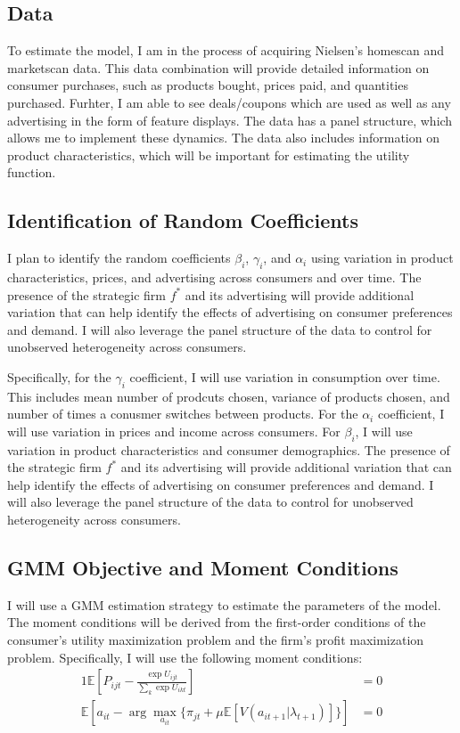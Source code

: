 \documentclass[12pt]{article}
\begin{document}
    \subsection{Data}
    To estimate the model, I am in the process of acquiring Nielsen's homescan and marketscan data. This data combination will provide detailed information on consumer purchases, such as products bought, prices paid, and quantities purchased. Furhter, I am able to see deals/coupons which are used as well as any advertising in the form of feature displays. The data has a panel structure, which allows me to implement these dynamics. The data also includes information on product characteristics, which will be important for estimating the utility function. 

    \subsection{Identification of Random Coefficients}

    I plan to identify the random coefficients $\beta_i$, $\gamma_i$, and $\alpha_i$ using variation in product characteristics, prices, and advertising across consumers and over time. The presence of the strategic firm $f^*$ and its advertising will provide additional variation that can help identify the effects of advertising on consumer preferences and demand. I will also leverage the panel structure of the data to control for unobserved heterogeneity across consumers.

    Specifically, for the $\gamma_i$ coefficient, I will use variation in consumption over time. This includes mean number of prodcuts chosen, variance of products chosen, and number of times a conusmer switches between products. For the $\alpha_i$ coefficient, I will use variation in prices and income across consumers. For $\beta_i$, I will use variation in product characteristics and consumer demographics. The presence of the strategic firm $f^*$ and its advertising will provide additional variation that can help identify the effects of advertising on consumer preferences and demand. I will also leverage the panel structure of the data to control for unobserved heterogeneity across consumers.

    \subsection{GMM Objective and Moment Conditions}

      I will use a GMM estimation strategy to estimate the parameters of the model. The moment conditions will be derived from the first-order conditions of the consumer's utility maximization problem and the firm's profit maximization problem. Specifically, I will use the following moment conditions:
      \begin{alignat*}{1}
        \mathbb{E}[P_{ijt} - \frac{\exp{U_{ijt}}}{\sum_k\exp{U_{ikt}}}] &= 0 \\
        \mathbb{E}[a_{it} - \arg\max_{a_{it}} \{\pi_{jt} + \mu \mathbb{E}[V(a_{it+1} | \lambda_{t+1})]\}] &= 0
      \end{alignat*}
\end{document}
